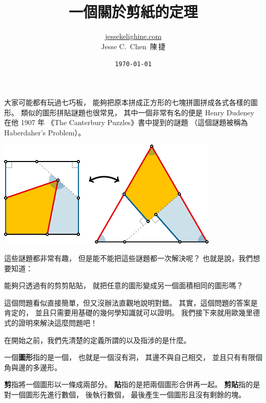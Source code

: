 \documentclass{article}
\title{一個關於剪紙的定理}
\author{\href{https://jessekelighine.com}{jessekelighine.com}\\Jesse C.\ Chen\ 陳\,捷}
\date{\texttt{\today}}
\begin{document}
\begin{multicols}{2}

\begin{spacing}{1}
	\maketitle\thispagestyle{fancy}
\end{spacing}

\noindent
大家可能都有玩過七巧板，
能夠把原本拼成正方形的七塊拼圖拼成各式各樣的圖形。
類似的圖形拼貼謎題也很常見，
其中一個非常有名的便是 Henry Dudeney 在他 1907 年
《The Canterbury Puzzles》書中提到的謎題
（這個謎題被稱為 Haberdaher's Problem）。
\begin{center}
	\includegraphics[scale=1]{figures/figure-example.pdf}
\end{center}
這些謎題都非常有趣，
但是能不能把這些謎題都一次解決呢？
也就是說，我們想要知道：
\begin{question*}
	能夠只透過有的剪剪貼貼，
	就把任意的圖形變成另一個面積相同的圖形嗎？
\end{question*}
\noindent
這個問題看似直接簡單，但又沒辦法直觀地說明對錯。
其實，這個問題的答案是肯定的，
並且只需要用基礎的幾何學知識就可以證明。
我們接下來就用歐幾里德式的證明來解決這麼問題吧！

\dinkus

\noindent
在開始之前，我們先清楚的定義所謂的以及指涉的是什麼。

\begin{definition}[圖形]
	一個\textbf{圖形}指的是一個，
	也就是一個沒有洞，
	其邊不與自己相交，
	並且只有有限個角與邊的多邊形。
\end{definition}

\begin{definition}[剪貼]
	\textbf{剪}指將一個圖形以一條成兩部分。
	\textbf{貼}指的是把兩個圖形合併再一起。
	\textbf{剪貼}指的是對一個圖形先進行數個，
	後執行數個，
	最後產生一個圖形且沒有剩餘的塊。
\end{definition}


\end{multicols}
\end{document}
